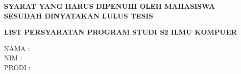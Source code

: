 \newpage
\begin{center}
{\normalfont\Large\bfseries\expandafter{SYARAT YANG HARUS DIPENUHI OLEH MAHASISWA SESUDAH DINYATAKAN LULUS TESIS}}
\par\nobreak
\end{center}

\vspace{1cm}
\begin{center}
{\normalfont\large\bfseries\expandafter{LIST PERSYARATAN PROGRAM STUDI S2 ILMU KOMPUER}}
\par\nobreak
\end{center}

\vspace{.5cm}
\begin{bfseries}
\begin{tabbing}
NAMA 	\= : \@fullname \\ [0.2cm]
NIM 	\> : \@idnum \\ [0.2cm]
PRODI 	\> : \@program
\end{tabbing}
\end{bfseries}


